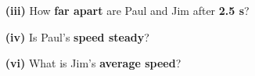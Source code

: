 \documentclass[A4,12pt]{article}
\begin{document}
\begin{enumerate}[label=\bfseries (\arabic*)]
\begin{itemize}
\begin{itemize}
        \item[\bf (iii)] How \textbf{far apart} are Paul and Jim after \textbf{2.5 s}?
        \item[\bf (iv)] Is Paul's \textbf{speed steady}?
        \item[\bf (vi)] What is Jim's \textbf{average speed}?

\end{itemize}
\end{itemize}
\end{enumerate}
\end{document}
